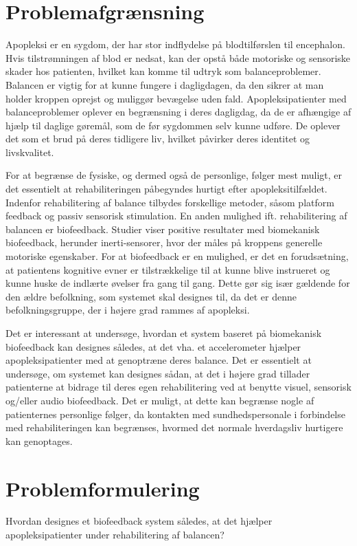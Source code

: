 \section{Problemafgrænsning}
Apopleksi er en sygdom, der har stor indflydelse på blodtilførslen til encephalon. Hvis tilstrømningen af blod er nedsat, kan der opstå både motoriske og sensoriske skader hos patienten, hvilket kan komme til udtryk som balanceproblemer. Balancen er vigtig for at kunne fungere i dagligdagen, da den sikrer at man holder kroppen oprejst og muliggør bevægelse uden fald. \cite{Nichols1997} Apopleksipatienter med balanceproblemer oplever en begrænsning i deres dagligdag, da de er afhængige af hjælp til daglige gøremål, som de før sygdommen selv kunne udføre. De oplever det som et brud på deres tidligere liv, hvilket påvirker deres identitet og livskvalitet. \cite{Sundhedsstyrelsen2010}

For at begrænse de fysiske, og dermed også de personlige, følger mest muligt, er det essentielt at rehabiliteringen påbegyndes hurtigt efter apopleksitilfældet. Indenfor rehabilitering af balance tilbydes forskellige metoder, såsom platform feedback og passiv sensorisk stimulation. En anden mulighed ift. rehabilitering af balancen er biofeedback. Studier viser positive resultater med biomekanisk biofeedback, herunder inerti-sensorer, hvor der måles på kroppens generelle motoriske egenskaber. \cite{Giggins2013} For at biofeedback er en mulighed, er det en forudsætning, at patientens kognitive evner er tilstrækkelige til at kunne blive instrueret og kunne huske de indlærte øvelser fra gang til gang. \cite{Middaugh1989} Dette gør sig især gældende for den ældre befolkning, som systemet skal designes til, da det er denne befolkningsgruppe, der i højere grad rammes af apopleksi. \cite{Sundhedsstyrelsen2011}

Det er interessant at undersøge, hvordan et system baseret på biomekanisk biofeedback kan designes således, at det vha. et accelerometer hjælper apopleksipatienter med at genoptræne deres balance. Det er essentielt at undersøge, om systemet kan designes sådan, at det i højere grad tillader patienterne at bidrage til deres egen rehabilitering ved at benytte visuel, sensorisk og/eller audio biofeedback. Det er muligt, at dette kan begrænse nogle af patienternes personlige følger, da kontakten med sundhedspersonale i forbindelse med rehabiliteringen kan begrænses, hvormed det normale hverdagsliv hurtigere kan genoptages. 

\section{Problemformulering}
Hvordan designes et biofeedback system således, at det hjælper apopleksipatienter under rehabilitering af balancen?


